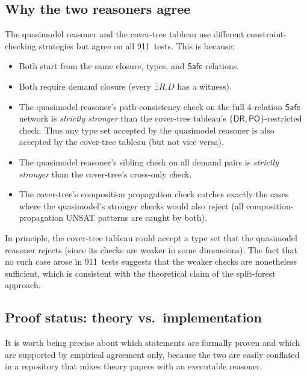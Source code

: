\documentclass[a4paper,11pt]{article}
\theoremstyle{definition}
\newcommand{\DR}{\ensuremath{\mathsf{DR}}}
\newcommand{\PO}{\ensuremath{\mathsf{PO}}}
\newcommand{\Safe}{\ensuremath{\mathsf{Safe}}}
\begin{document}
\subsection{Why the two reasoners agree}

The quasimodel reasoner and the cover-tree tableau use different
constraint-checking strategies but agree on all 911~tests.
This is because:
\begin{itemize}[nosep]
  \item Both start from the same closure, types, and $\Safe$
    relations.
  \item Both require demand closure (every $\exists R.D$ has a
    witness).
  \item The quasimodel reasoner's path-consistency check on the
    full 4-relation $\Safe$ network is \emph{strictly stronger}
    than the cover-tree tableau's $\{\DR,\PO\}$-restricted check.
    Thus any type set accepted by the quasimodel reasoner is
    also accepted by the cover-tree tableau (but not vice versa).
  \item The quasimodel reasoner's sibling check on all demand
    pairs is \emph{strictly stronger} than the cover-tree's
    cross-only check.
  \item The cover-tree's composition propagation check catches
    exactly the cases where the quasimodel's stronger checks
    would also reject (all composition-propagation UNSAT patterns
    are caught by both).
\end{itemize}

In principle, the cover-tree tableau could accept a type set that
the quasimodel reasoner rejects (since its checks are weaker in
some dimensions).  The fact that no such case arose in 911~tests
suggests that the weaker checks are nonetheless sufficient, which
is consistent with the theoretical claim of the split-forest
approach.

\subsection{Proof status: theory vs.~implementation}
\label{sec:proof-status}

It is worth being precise about which statements are formally
proven and which are supported by empirical agreement only, because
the two are easily conflated in a repository that mixes theory
papers with an executable reasoner.
\end{document}
